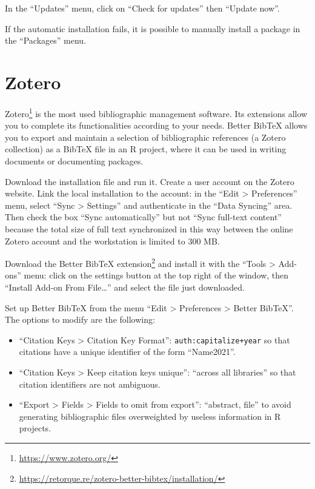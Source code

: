 \documentclass[
  12pt,
  american,
  a4paper,
  extrafontsizes,onecolumn,openright
  ]{memoir}
\providecommand{\tightlist}{%
  \setlength{\itemsep}{0pt}\setlength{\parskip}{0pt}}
\begin{document}
In the \enquote{Updates} menu, click on \enquote{Check for updates} then \enquote{Update now}.

If the automatic installation fails, it is possible to manually install a package in the \enquote{Packages} menu.

\section{Zotero}\label{sec:Zotero}

Zotero\footnote{\url{https://www.zotero.org/}} is the most used bibliographic management software.
Its extensions allow you to complete its functionalities according to your needs.
Better BibTeX allows you to export and maintain a selection of bibliographic references (a Zotero collection) as a BibTeX file in an R project, where it can be used in writing documents or documenting packages.

Download the installation file and run it.
Create a user account on the Zotero website.
Link the local installation to the account: in the \enquote{Edit \textgreater{} Preferences} menu, select \enquote{Sync \textgreater{} Settings} and authenticate in the \enquote{Data Syncing} area.
Then check the box \enquote{Sync automatically} but not \enquote{Sync full-text content} because the total size of full text synchronized in this way between the online Zotero account and the workstation is limited to 300 MB.

Download the Better BibTeX extension\footnote{\url{https://retorque.re/zotero-better-bibtex/installation/}} and install it with the \enquote{Tools \textgreater{} Add-ons} menu: click on the settings button at the top right of the window, then \enquote{Install Add-on From File\ldots{}} and select the file just downloaded.

Set up Better BibTeX from the menu \enquote{Edit \textgreater{} Preferences \textgreater{} Better BibTeX}.
The options to modify are the following:

\begin{itemize}
\tightlist
\item
  \enquote{Citation Keys \textgreater{} Citation Key Format}: \texttt{auth:capitalize+year} so that citations have a unique identifier of the form \enquote{Name2021}.
\item
  \enquote{Citation Keys \textgreater{} Keep citation keys unique}: \enquote{across all libraries} so that citation identifiers are not ambiguous.
\item
  \enquote{Export \textgreater{} Fields \textgreater{} Fields to omit from export}: \enquote{abstract, file} to avoid generating bibliographic files overweighted by useless information in R projects.
\end{itemize}
\end{document}
